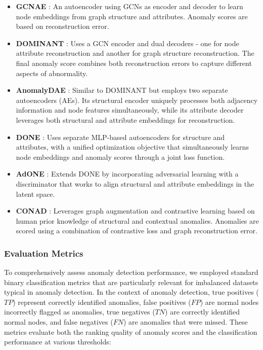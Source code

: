 \documentclass[pdflatex,sn-mathphys-num]{sn-jnl}%
\theoremstyle{thmstyleone}%
\theoremstyle{thmstyletwo}%
\theoremstyle{thmstylethree}%
\begin{document}
\begin{itemize}
    \item \textbf{GCNAE} \cite{kipf2016variational,NEURIPS2022-acc1ec4a}: An autoencoder using GCNs as encoder and decoder to learn node embeddings from graph structure and attributes. Anomaly scores are based on reconstruction error.
    \item \textbf{DOMINANT} \cite{ding2019deep}: Uses a GCN encoder and dual decoders - one for node attribute reconstruction and another for graph structure reconstruction. The final anomaly score combines both reconstruction errors to capture different aspects of abnormality.
    \item \textbf{AnomalyDAE} \cite{fan2020anomalydae}: Similar to DOMINANT but employs two separate autoencoders (AEs). Its structural encoder uniquely processes both adjacency information and node features simultaneously, while its attribute decoder leverages both structural and attribute embeddings for reconstruction.
    \item \textbf{DONE} \cite{bandyopadhyay2020outlier}: Uses separate MLP-based autoencoders for structure and attributes, with a unified optimization objective that simultaneously learns node embeddings and anomaly scores through a joint loss function.
    \item \textbf{AdONE} \cite{bandyopadhyay2020outlier}: Extends DONE by incorporating adversarial learning with a discriminator that works to align structural and attribute embeddings in the latent space.
    \item \textbf{CONAD} \cite{xu2022contrastive}: Leverages graph augmentation and contrastive learning based on human prior knowledge of structural and contextual anomalies. Anomalies are scored using a combination of contrastive loss and graph reconstruction error.
\end{itemize}

\subsubsection{Evaluation Metrics}
To comprehensively assess anomaly detection performance, we employed standard binary classification metrics that are particularly relevant for imbalanced datasets typical in anomaly detection. In the context of anomaly detection, true positives ($TP$) represent correctly identified anomalies, false positives ($FP$) are normal nodes incorrectly flagged as anomalies, true negatives ($TN$) are correctly identified normal nodes, and false negatives ($FN$) are anomalies that were missed. These metrics evaluate both the ranking quality of anomaly scores and the classification performance at various thresholds:
\end{document}
